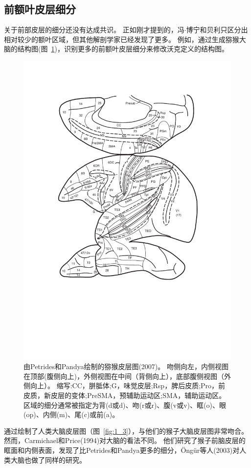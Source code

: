 \subsection{前额叶皮层细分}
关于前部皮层的细分还没有达成共识。
正如刚才提到的，冯$\cdot$博宁和贝利只区分出相对较少的额叶区域，但其他解剖学家已经发现了更多。
例如，通过生成猕猴大脑的结构图(图~\ref{fig:1_2})，识别更多的前额叶皮层细分来修改沃克定义的结构图。


\begin{figure}[!htb]
	\centering
	\includegraphics[width=0.65\linewidth]{chap1/1_2}
	\caption{由Petrides和Pandya绘制的猕猴皮层图(2007)。
		吻侧向左，内侧视图在顶部(腹侧向上)，外侧视图在中间（背侧向上），底部腹侧视图（外侧向上）。
		缩写:CC，胼胝体;G，味觉皮层;Rsp，脾后皮质;Pro，前皮质，新皮层的变体;PreSMA，预辅助运动区;SMA，辅助运动区。
		区域的细分通常被指定为背(d或d)、吻(r或r)、腹(v或v)、眶(o)、眼(op)、内侧(m)、尾(c)或前(a)\cite{petrides2007efferent}。\label{fig:1_2}}
\end{figure}


\par
通过绘制了人类大脑皮层图（图~\ref{fig:1_3}），与他们的猴子大脑皮层图非常吻合\cite{petrides1995impairments}。
然而，Carmichael和Price(1994)对大脑的看法不同\cite{carmichael1994architectonic}。
他们研究了猴子前脑皮层的眶面和内侧表面，发现了比Petrides和Pandya更多的细分，Öngür等人(2003)对人类大脑也做了同样的研究\cite{ongur2003architectonic}。

